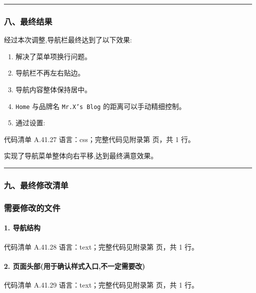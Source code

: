 \documentclass[lang=cn,scheme=chinese,color=blue,device=normal,toc=onecol,math=cm]{elegantbook}
\begin{document}
\medskip\hrule\medskip


\subsubsection{八、最终结果}


经过本次调整,导航栏最终达到了以下效果:\par


\begin{enumerate}
\item 解决了菜单项换行问题。
\item 导航栏不再左右贴边。
\item 导航内容整体保持居中。
\item \texttt{Home} 与品牌名 \texttt{Mr.X's Blog} 的距离可以手动精细控制。
\item 通过设置:
\end{enumerate}


\begin{codeindexbox}{代码清单 A.41.27}
语言：css；完整代码见附录第 \pageref{code:41:27} 页，共 1 行。
\end{codeindexbox}


实现了导航菜单整体向右平移,达到最终满意效果。\par


\medskip\hrule\medskip


\subsubsection{九、最终修改清单}


\subsubsection{需要修改的文件}


\paragraph{1. 导航结构}


\begin{codeindexbox}{代码清单 A.41.28}
语言：text；完整代码见附录第 \pageref{code:41:28} 页，共 1 行。
\end{codeindexbox}


\paragraph{2. 页面头部(用于确认样式入口,不一定需要改)}


\begin{codeindexbox}{代码清单 A.41.29}
语言：text；完整代码见附录第 \pageref{code:41:29} 页，共 1 行。
\end{codeindexbox}
\end{document}
